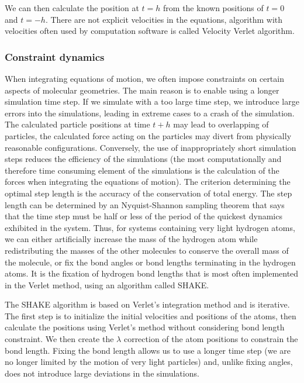 We can then calculate the position at $t=h$ from the known positions of $t=0$ and $t=-h$. There are not explicit velocities in the equations, algorithm with velocities often used by computation software is called Velocity Verlet algorithm. \cite{mdskripta}

\subsubsection{Constraint dynamics}

When integrating equations of motion, we often impose constraints on certain aspects of molecular geometries. The main reason is to enable using a longer simulation time step. If we simulate with a too large time step, we introduce large errors into the simulations, leading in extreme cases to a crash of the simulation. The calculated particle positions at time $t+h$ may lead to overlapping of particles, the calculated force acting on the particles may divert from physically reasonable configurations. Conversely, the use of inappropriately short simulation steps reduces the efficiency of the simulations (the most computationally and therefore time consuming element of the simulations is the calculation of the forces when integrating the equations of motion). \cite{mdskripta} The criterion determining the optimal step length is the accuracy of the conservation of total energy. The step length can be determined by an Nyquist-Shannon \cite{shannon_communication_1949} sampling theorem that says that the time step must be half or less of the period of the quickest dynamics exhibited in the system. Thus, for systems containing very light hydrogen atoms, we can either artificially increase the mass of the hydrogen atom while redistributing the masses of the other molecules to conserve the overall mass of the molecule, or fix the bond angles or bond lengths terminating in the hydrogen atoms. It is the fixation of hydrogen bond lengths that is most often implemented in the Verlet method, using an algorithm called SHAKE.  

\newpage
The SHAKE algorithm \cite{ryckaert_numerical_1977} is based on Verlet's integration method and is iterative. The first step is to initialize the initial velocities and positions of the atoms, then calculate the positions using Verlet's method without considering bond length constraint. We then create the $\lambda$ correction of the atom positions to constrain the bond length. Fixing the bond length allows us to use a longer time step (we are no longer limited by the motion of very light particles) and, unlike fixing angles, does not introduce large deviations in the simulations. \cite{mdskripta}

